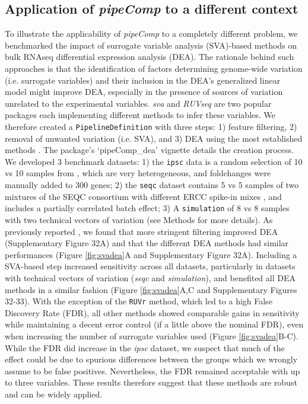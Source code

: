 \documentclass[11pt]{article}
\begin{document}
{\color{red}\subsection*{Application of \textit{pipeComp} to a different context}

To illustrate the applicability of \textit{pipeComp} to a completely different problem, we benchmarked the impact of surrogate variable analysis (SVA)-based methods on bulk RNAseq differential expression analysis (DEA). The rationale behind such approaches is that the identification of factors determining genome-wide variation (i.e. surrogate variables) and their inclusion in the DEA's generalized linear model might improve DEA, especially in the presence of sources of variation unrelated to the experimental variables. \textit{sva} \citep{leekCapturingHeterogeneityGene2007,leekSvaPackageRemoving2012} and \textit{RUVseq} \citep{rissoNormalizationRNAseq2014a} are two popular packages each implementing different methods to infer these variables. We therefore created a \texttt{PipelineDefinition} with three steps: 1) feature filtering, 2) removal of unwanted variation (i.e. SVA), and 3) DEA using the most established methods  \citep{germainRNAontheBENCHComputationalEmpirical2016}. The package's `pipeComp\_dea' vignette details the creation process. We developed 3 benchmark datasets: 1) the \texttt{ipsc} data is a random selection of 10 vs 10 samples from \citep{carcamoOriveAnalysisTranscriptional2017}, which are very heterogeneous, and foldchanges were manually added to 300 genes; 2) the \texttt{seqc} dataset contains 5 vs 5 samples of two mixtures of the SEQC consortium with different ERCC spike-in mixes \citep{ComprehensiveAssessment2014}, and includes a partially correlated batch effect; 3) A \texttt{simulation} of 8 vs 8 samples with two technical vectors of variation (see Methods for more details). As previously reported \citep{ComprehensiveAssessment2014}, we found that more stringent filtering improved DEA (Supplementary Figure 32A) and that the different DEA methods had similar performances (Figure \ref{fig:svadea}A and Supplementary Figure 32A). Including a SVA-based step increased sensitivity across all datasets, particularly in datasets with technical vectors of variation (\textit{seqc} and \textit{simulation}), and benefited all DEA methods in a similar fashion (Figure \ref{fig:svadea}A,C and Supplementary Figures 32-33). With the exception of the \texttt{RUVr} method, which led to a high False Discovery Rate (FDR), all other methods showed comparable gains in sensitivity while maintaining a decent error control (if a little above the nominal FDR), even when increasing the number of surrogate variables used (Figure \ref{fig:svadea}B-C). While the FDR did increase in the \textit{ipsc} dataset, we suspect that much of the effect could be due to spurious differences \citep{germainTamingHumanGenetic2017} between the groups which we wrongly assume to be false positives. Nevertheless, the FDR remained acceptable with up to three variables. These results therefore suggest that these methods are robust and can be widely applied.}
\end{document}
